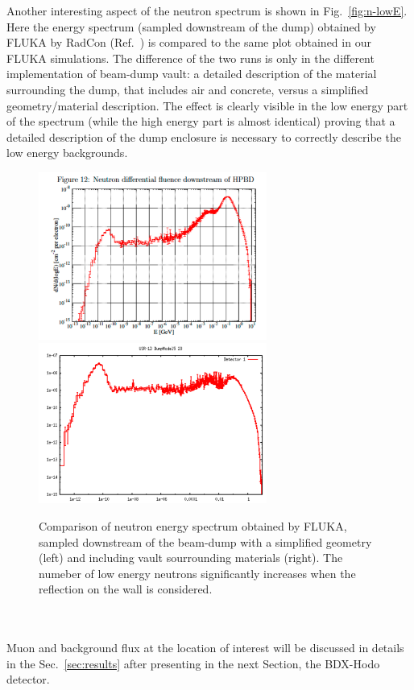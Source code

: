 Another interesting aspect of the neutron spectrum is shown in Fig.~\ref{fig:n-lowE}. Here the energy spectrum (sampled downstream of the dump) obtained by FLUKA by RadCon (Ref.~\cite{jnote-bd}) is compared to the same plot obtained in our FLUKA simulations. The difference of the two runs is only in the different implementation of  beam-dump vault: a detailed description of the material surrounding the dump,  that includes air and concrete,  versus a simplified geometry/material description.   The effect is clearly visible in the low energy part of the spectrum (while the high energy part is almost identical) proving that a detailed description of the dump enclosure is necessary to correctly describe the low energy backgrounds.
\begin{figure}[h!] 
\center
\includegraphics[width=7.5cm]{figs/bg-lowN-george.pdf}    
\includegraphics[width=7.5cm]{figs/NeutronsDumpComparisonDnDlogE_1D.pdf}   
\caption{Comparison of neutron energy spectrum obtained by FLUKA, sampled downstream of the beam-dump with a simplified geometry (left) and including vault sourrounding materials (right). The numeber of low energy neutrons significantly increases when the reflection on the wall is considered.}
\label{fig:bg-lowE}
\end{figure}
\\ \\ 
Muon and background flux  at  the location of interest will be discussed in details in the Sec.~\ref{sec:results} after presenting in the next Section,  the BDX-Hodo detector. 



